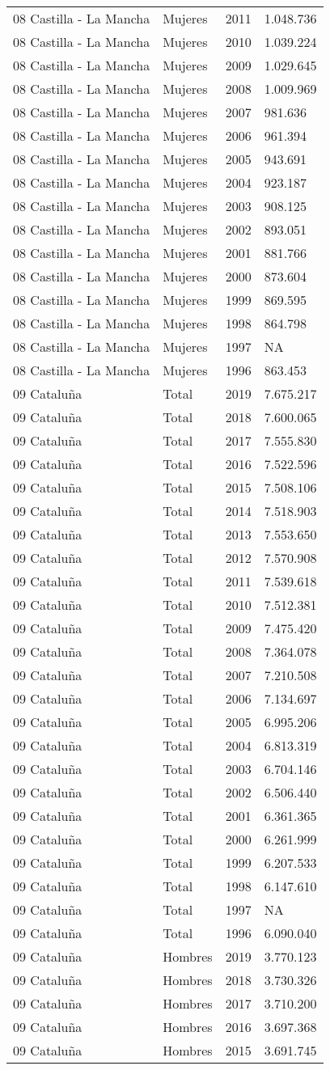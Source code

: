 \documentclass[
]{article}
\begin{document}
\begin{longtable}[]{@{}llrl@{}}
08 Castilla - La Mancha & Mujeres & 2011 & 1.048.736\tabularnewline
08 Castilla - La Mancha & Mujeres & 2010 & 1.039.224\tabularnewline
08 Castilla - La Mancha & Mujeres & 2009 & 1.029.645\tabularnewline
08 Castilla - La Mancha & Mujeres & 2008 & 1.009.969\tabularnewline
08 Castilla - La Mancha & Mujeres & 2007 & 981.636\tabularnewline
08 Castilla - La Mancha & Mujeres & 2006 & 961.394\tabularnewline
08 Castilla - La Mancha & Mujeres & 2005 & 943.691\tabularnewline
08 Castilla - La Mancha & Mujeres & 2004 & 923.187\tabularnewline
08 Castilla - La Mancha & Mujeres & 2003 & 908.125\tabularnewline
08 Castilla - La Mancha & Mujeres & 2002 & 893.051\tabularnewline
08 Castilla - La Mancha & Mujeres & 2001 & 881.766\tabularnewline
08 Castilla - La Mancha & Mujeres & 2000 & 873.604\tabularnewline
08 Castilla - La Mancha & Mujeres & 1999 & 869.595\tabularnewline
08 Castilla - La Mancha & Mujeres & 1998 & 864.798\tabularnewline
08 Castilla - La Mancha & Mujeres & 1997 & NA\tabularnewline
08 Castilla - La Mancha & Mujeres & 1996 & 863.453\tabularnewline
09 Cataluña & Total & 2019 & 7.675.217\tabularnewline
09 Cataluña & Total & 2018 & 7.600.065\tabularnewline
09 Cataluña & Total & 2017 & 7.555.830\tabularnewline
09 Cataluña & Total & 2016 & 7.522.596\tabularnewline
09 Cataluña & Total & 2015 & 7.508.106\tabularnewline
09 Cataluña & Total & 2014 & 7.518.903\tabularnewline
09 Cataluña & Total & 2013 & 7.553.650\tabularnewline
09 Cataluña & Total & 2012 & 7.570.908\tabularnewline
09 Cataluña & Total & 2011 & 7.539.618\tabularnewline
09 Cataluña & Total & 2010 & 7.512.381\tabularnewline
09 Cataluña & Total & 2009 & 7.475.420\tabularnewline
09 Cataluña & Total & 2008 & 7.364.078\tabularnewline
09 Cataluña & Total & 2007 & 7.210.508\tabularnewline
09 Cataluña & Total & 2006 & 7.134.697\tabularnewline
09 Cataluña & Total & 2005 & 6.995.206\tabularnewline
09 Cataluña & Total & 2004 & 6.813.319\tabularnewline
09 Cataluña & Total & 2003 & 6.704.146\tabularnewline
09 Cataluña & Total & 2002 & 6.506.440\tabularnewline
09 Cataluña & Total & 2001 & 6.361.365\tabularnewline
09 Cataluña & Total & 2000 & 6.261.999\tabularnewline
09 Cataluña & Total & 1999 & 6.207.533\tabularnewline
09 Cataluña & Total & 1998 & 6.147.610\tabularnewline
09 Cataluña & Total & 1997 & NA\tabularnewline
09 Cataluña & Total & 1996 & 6.090.040\tabularnewline
09 Cataluña & Hombres & 2019 & 3.770.123\tabularnewline
09 Cataluña & Hombres & 2018 & 3.730.326\tabularnewline
09 Cataluña & Hombres & 2017 & 3.710.200\tabularnewline
09 Cataluña & Hombres & 2016 & 3.697.368\tabularnewline
09 Cataluña & Hombres & 2015 & 3.691.745\tabularnewline

\end{longtable}
\end{document}
